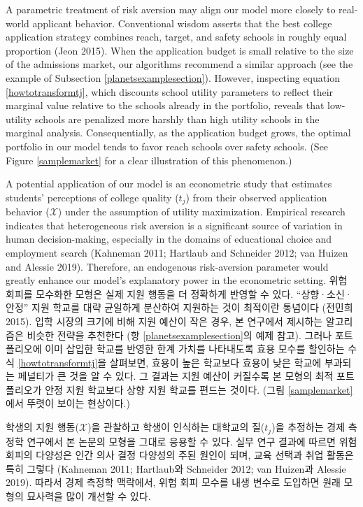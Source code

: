 \documentclass[11pt]{article} %
\theoremstyle{definition}
\theoremstyle{definition}
\begin{document}
\ifen
A parametric treatment of risk aversion may align our model more closely to real-world applicant behavior. Conventional wisdom asserts that the best college application strategy combines reach, target, and safety schools in roughly equal proportion (Jeon 2015). When the application budget is small relative to the size of the admissions market, our algorithms recommend a similar approach (see the example of Subsection \ref{planetsexamplesection}). However, inspecting equation \eqref{howtotransformtj}, which discounts school utility parameters to reflect their marginal value relative to the schools already in the portfolio, reveals that low-utility schools are penalized more harshly than high utility schools in the marginal analysis. Consequentially, as the application budget grows, the optimal portfolio in our model tends to favor reach schools over safety schools. (See Figure \ref{samplemarket} for a clear illustration of this phenomenon.)
 
A potential application of our model is an econometric study that estimates students’ perceptions of college quality ($t_j$) from their observed application behavior ($\mathcal{X}$) under the assumption of utility maximization. Empirical research indicates that heterogeneous risk aversion is a significant source of variation in human decision-making, especially in the domains of educational choice and employment search (Kahneman 2011; Hartlaub and Schneider 2012; van Huizen and Alessie 2019). Therefore, an endogenous risk-aversion parameter would greatly enhance our model’s explanatory power in the econometric setting.
\else
위험 회피를 모수화한 모형은 실제 지원 행동을 더 정확하게 반영할 수 있다. ``상향·소신·안정'' 지원 학교를 대략 균일하게 분산하여 지원하는 것이 최적이란 통념이다 (전민희 2015). 입학 시장의 크기에 비해 지원 예산이 작은 경우, 본 연구에서 제시하는 알고리즘은 비슷한 전략을 추천한다 (항 \ref{planetsexamplesection}의 예제 참고). 그러나 포트폴리오에 이미 삽입한 학교를 반영한 한계 가치를 나타내도록 효용 모수를 할인하는 수식 \eqref{howtotransformtj}을 살펴보면, 효용이 높은 학교보다 효용이 낮은 학교에 부과되는 페널티가 큰 것을 알 수 있다. 그 결과는 지원 예산이 커질수록 본 모형의 최적 포트폴리오가 안정 지원 학교보다 상향 지원 학교를 편드는 것이다. (그림 \ref{samplemarket}에서 뚜렷이 보이는 현상이다.)

학생의 지원 행동($\mathcal{X}$)을 관찰하고 학생이 인식하는 대학교의 질($t_j$)을 추정하는 경제 측정학 연구에서 본 논문의 모형을 그대로 응용할 수 있다. 실무 연구 결과에 따르면 위험 회피의 다양성은 인간 의사 결정 다양성의 주된 원인이 되며, 교육 선택과 취업 활동은 특히 그렇다 (Kahneman 2011; Hartlaub와 Schneider 2012; van Huizen과 Alessie 2019). 따라서 경제 측정학 맥락에서, 위험 회피 모수를 내생 변수로 도입하면 원래 모형의 묘사력을 많이 개선할 수 있다.
\fi
\end{document}
